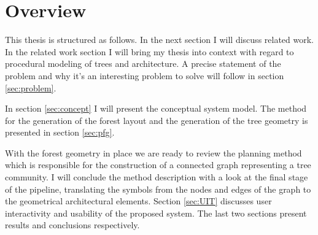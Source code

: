 \section{Overview}
\label{subsec:overview}

This thesis is structured as follows. In the next section I will discuss related work. In the related work section I will bring my thesis into context with regard to procedural modeling of trees and architecture. A precise statement of the problem and why it's an interesting problem to solve will follow in section \ref{sec:problem}. 

In section \ref{sec:concept} I will present the conceptual system model. The method for the generation of the forest layout and the generation of the tree geometry is presented in section \ref{sec:pfg}.  
 
With the forest geometry in place we are ready to review the planning method which is responsible for the construction of a connected graph representing a tree community. I will conclude the method description with a look at the final stage of the pipeline, translating the symbols from the nodes and edges of the graph to the geometrical architectural elements. Section \ref{sec:UIT} discusses user interactivity and usability of the proposed system. The last two sections present results and conclusions respectively.     
